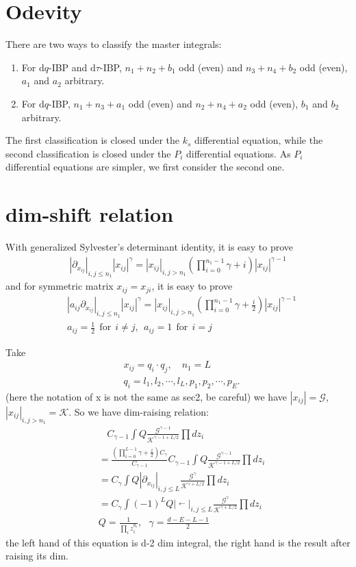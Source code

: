 \documentclass[a4paper,12pt]{article}
\newcommand{\n}{\nonumber}
\def\di{{\mathrm{d}}}
\newcommand{\mG}{\mathcal{G}}
\newcommand{\mK}{\mathcal{K}}
\begin{document}
\section{Odevity}
There are two ways to classify the master integrals: 
\begin{enumerate}
\item For $\di q$-IBP and $\di \tau$-IBP, $n_1+n_2+b_1$ odd (even) and $n_3+n_4+b_2$ odd (even), $a_1$ and $a_2$ arbitrary.
\item For $\di q$-IBP, $n_1+n_3+a_1$ odd (even) and $n_2+n_4+a_2$ odd (even), $b_1$ and $b_2$ arbitrary.
\end{enumerate}
The first classification is closed under the $k_s$ differential equation, while the second classification is closed under the $P_i$ differential equations. As $P_i$ differential equations are simpler, we first consider the second one.


\section{dim-shift relation}
With generalized Sylvester's determinant identity, it is easy to prove
\begin{align}
|\partial_{x_{ij}}|_{i,j\leq n_1} |x_{ij}|^\gamma = |x_{ij}|_{i,j> n_1}  \left(\prod_{i=0}^{n_1-1} \gamma+i \right)   |x_{ij}|^{\gamma-1}
\end{align}
and for symmetric matrix $x_{ij}=x_{ji}$,  it is easy to prove
\begin{align}
&|a_{ij} \partial_{x_{ij}}|_{i,j\leq n_1} |x_{ij}|^\gamma = |x_{ij}|_{i,j> n_1}  \left(\prod_{i=0}^{n_1-1} \gamma+\frac{i}{2}\right)   |x_{ij}|^{\gamma-1}  \n\\
&a_{ij}=\frac{1}{2} ~~\text{for}~~i\neq j,  ~~a_{ij}=1 ~~\text{for}~~i=j
\end{align}


Take 
\begin{align}
&x_{ij}=q_i \cdotp q_j,\quad  n_1=L \n\\
&q_i=l_1,l_2,\cdots,l_L,p_1,p_2,\cdots,p_E.
\end{align}
(here the notation of x is not the same as sec2, be careful) we have $|x_{ij}|=\mG$, $|x_{ij}|_{i,j> n_1}=\mK$. So we have dim-raising relation:
\begin{align}
&~~~~ C_{\gamma-1} \int    Q   \frac{ \mG^{\gamma-1} }{\mK^{\gamma-1+L/2}}  \prod dz_i\n\\
&=\frac{ \left(\prod_{i=0}^{L-1} \gamma+\frac{i}{2}\right)  C_\gamma}{C_{\gamma-1}} C_{\gamma-1} \int    Q   \frac{\mG^{\gamma-1}}{\mK^{\gamma-1+L/2}} \prod dz_i\n\\
&=C_{\gamma}\int  Q |\partial_{x_{ij}}|_{i,j\leq L} \frac{\mG^\gamma}{\mK^{\gamma+L/2}}  \prod dz_i\n\\
&=C_{\gamma}\int  (-1)^L Q |\mathop{ \partial_{x_{ij}}  }\limits ^{\leftarrow}|_{i,j\leq L} \frac{\mG^\gamma}{\mK^{\gamma+L/2}} \prod dz_i\n\\
&Q=\frac{1}{\prod_i z_i^{a_i}}, ~~~\gamma=\frac{d-E-L-1}{2}
\end{align}
the left hand of this equation is d-2 dim integral, the right hand is the result after raising its dim.
\end{document}
